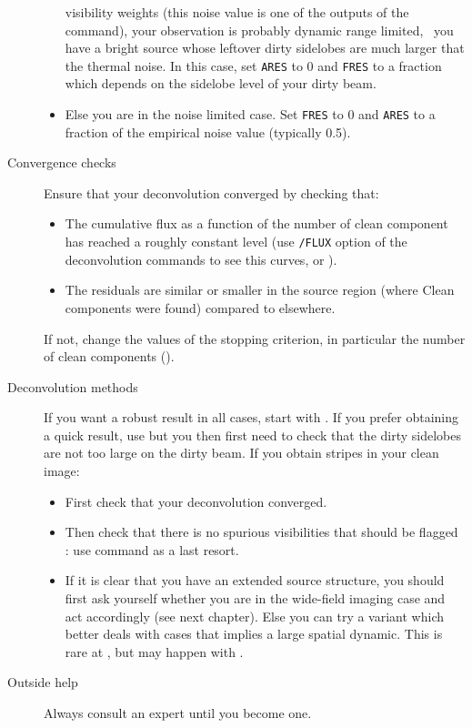 \begin{description}
\begin{itemize}
    visibility weights (this noise value is one of the outputs of the
     command), your observation is probably dynamic range limited,
    \ie\ you have a bright source whose leftover dirty sidelobes are much larger
    that the thermal noise. In this case, set \texttt{ARES} to 0 and
    \texttt{FRES} to a fraction which depends on the sidelobe level of your
    dirty beam.
  \item Else you are in the noise limited case. Set \texttt{FRES} to 0 and
    \texttt{ARES} to a fraction of the empirical noise value (typically
    0.5).
  \end{itemize}
\item[Convergence checks] Ensure that your deconvolution converged by
  checking that:
  \begin{itemize}\itemsep 0pt
  \item The cumulative flux as a function of the number of clean component
    has reached a roughly constant level (use \texttt{/FLUX} option of the
    deconvolution commands to see this curves, or ).
  \item The residuals are similar or smaller in the source region (where Clean
  components were found) compared to elsewhere.
  \end{itemize}
  If not, change the values of the stopping criterion, in particular the
  number of clean components ().
\item[Deconvolution methods] If you want a robust result in all cases,
  start with . If you prefer obtaining a quick result, use
   but you then first need to check that the dirty sidelobes are
  not too large on the dirty beam. If you obtain stripes in your clean
  image:
  \begin{itemize}\itemsep 0pt
  \item First check that your deconvolution converged.
  \item Then check that there is no spurious visibilities that should 
   be flagged : use command  as a last resort.
  \item If it is clear that you have an extended source structure, you
    should first ask yourself whether you are in the wide-field imaging
    case and act accordingly (see next chapter). Else you can try a
    \clean{} variant which better deals with cases that implies a large
    spatial dynamic. This is rare at \NOEMA{}, but may happen with \ALMA .
  \end{itemize}
\item[Outside help] Always consult an expert until you become one.
\end{description}

